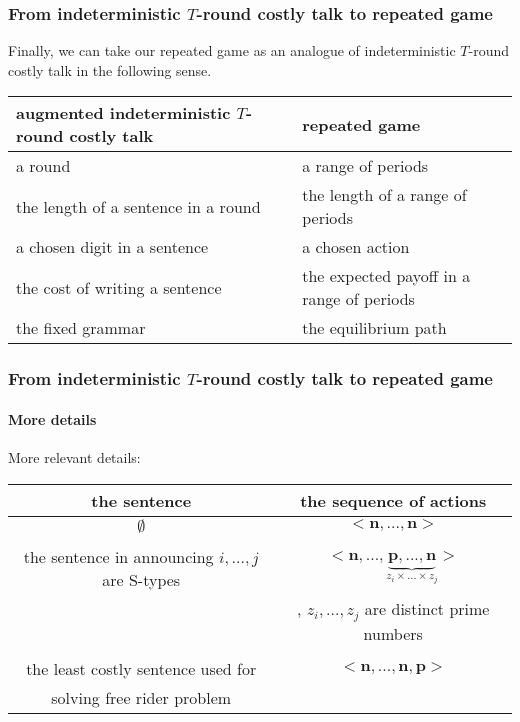 \documentclass[9pt]{beamer}
\begin{document}
\begin{frame}
  \frametitle{From indeterministic $T$-round costly talk to repeated game}

Finally, we can take our repeated game as an analogue of indeterministic $T$-round costly talk in the following sense.

\begin{center}
\begin{table}[h]
\begin{tabular}{ll }
augmented indeterministic $T$-round costly talk & repeated game \\
\hline
a round & a range of periods\\
the length of a sentence in a round & the length of a range of periods\\
a chosen digit in a sentence & a chosen action\\
the cost of writing a sentence & the expected payoff in a range of periods\\
the fixed grammar & the equilibrium path
\end{tabular}
\end{table}
\end{center}
\end{frame}


\begin{frame}
  \frametitle{From indeterministic $T$-round costly talk to repeated game}
\framesubtitle{More details}

More relevant details:


\begin{center}
\begin{table}[h]
\begin{tabular}{cc }
the sentence & the sequence of actions \\
\hline
$\emptyset$ & $<\textbf{n},...,\textbf{n}>$\\
\\
the sentence in announcing $i,...,j$ are S-types & $<\textbf{n},...,\underbrace{\textbf{p},...,\textbf{n}}_{z_i\times ...\times z_j}>$\\
 & , $z_i,...,z_j$ are distinct prime numbers \\
 \\
the least costly sentence used for  & $<\textbf{n},...,\textbf{n},\textbf{p}>$\\
solving free rider problem & \\
\end{tabular}
\end{table}
\end{center}



\end{frame}
\end{document}
